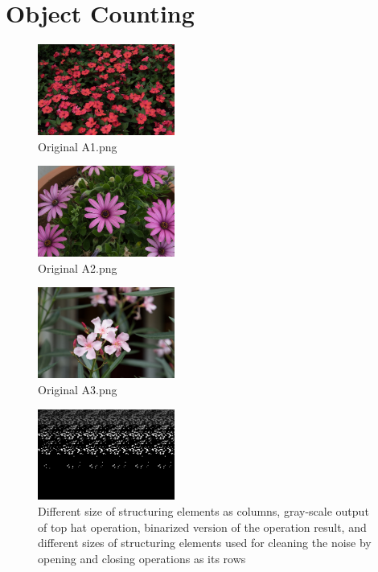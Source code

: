 \documentclass[conference]{IEEEtran}
\begin{document}
\section{Object Counting}
    \begin{figure}[h]
        \centering
        \includegraphics[width=0.4\textwidth]{resources/A1_compact.jpg}
        \caption{Original A1.png}
        \label{fig:a1_input}
    \end{figure}
    \begin{figure}[h]
        \centering
        \includegraphics[width=0.4\textwidth]{resources/A2_compact.jpg}
        \caption{Original A2.png}
        \label{fig:a2_input}
    \end{figure}
    \begin{figure}[h]
        \centering
        \includegraphics[width=0.4\textwidth]{resources/A3_compact.jpg}
        \caption{Original A3.png}
        \label{fig:a3_input}
    \end{figure}
    
    \begin{figure}[h]
        \centering
        \includegraphics[width=0.4\textwidth]{resources/A1_compare.jpg}
        \caption{Different size of structuring elements as columns, gray-scale output of top hat operation, binarized version of the operation result, and different sizes of structuring elements used for cleaning the noise by opening and closing operations as its rows}
        \label{fig:a1_compare}
    \end{figure}
\end{document}
